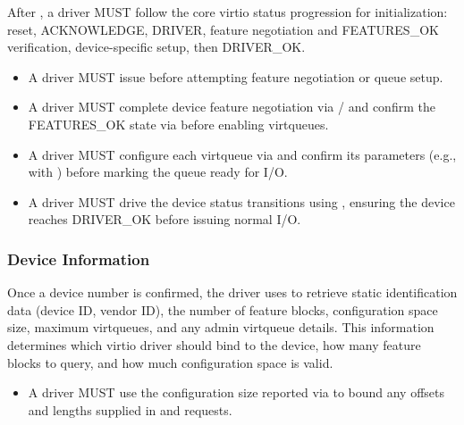 After , a driver MUST follow the core virtio status
progression for initialization: reset, ACKNOWLEDGE, DRIVER, feature
negotiation and FEATURES\_OK verification, device-specific setup, then
DRIVER\_OK.

\begin{itemize}
  \item A driver MUST issue  before attempting feature
        negotiation or queue setup.
  \item A driver MUST complete device feature negotiation via
        /
        and confirm the FEATURES\_OK state via  before
        enabling virtqueues.
  \item A driver MUST configure each virtqueue via  and
        confirm its parameters (e.g., with ) before marking
        the queue ready for I/O.
  \item A driver MUST drive the device status transitions using
        , ensuring the device reaches DRIVER\_OK
        before issuing normal I/O.
\end{itemize}

\subsubsection{Device Information}
\label{sec:Virtio Transport Options / Virtio Over Messages / Device Initialization / Device Information}

Once a device number is confirmed, the driver uses  to
retrieve static identification data (device ID, vendor ID), the number of
feature blocks, configuration space size, maximum virtqueues, and any admin
virtqueue details. This information determines which virtio driver should bind
to the device, how many feature blocks to query, and how much configuration
space is valid.

\begin{itemize}
  \item A driver MUST use the configuration size reported via
         to bound any offsets and lengths supplied in
         and  requests.
\end{itemize}

